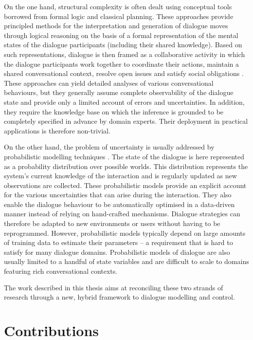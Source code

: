 On the one hand, structural complexity is often dealt using conceptual tools borrowed from formal logic and classical planning.  These approaches provide principled methods for the interpretation and generation of dialogue moves through logical reasoning on the basis of a formal representation of the mental states of the dialogue participants (including their shared knowledge). Based on such representations, dialogue is then framed as a collaborative activity in which the dialogue participants work together to coordinate their actions, maintain a shared conversational context, resolve open issues and satisfy social obligations \citep{larsson2002,Jokinen:2009,Ginzburg2012}. These approaches can yield detailed analyses of various conversational behaviours, but they generally assume complete observability of the dialogue state and provide only a limited account of errors and uncertainties. In addition, they require the knowledge base on which the inference is grounded to be completely specified in advance by domain experts.  Their deployment in practical applications is therefore non-trivial. 

On the other hand, the problem of uncertainty is usually addressed by probabilistic modelling techniques \citep{Roy:2000,FramptonL09,Young:2010}.  The state of the dialogue is here represented as a probability distribution over possible worlds.  This distribution represents the system's current knowledge of the interaction and is regularly updated as new observations are collected. These probabilistic models provide an explicit account for the various uncertainties that can arise during the interaction. They also enable the dialogue behaviour to be automatically optimised in a data-driven manner instead of relying on hand-crafted mechanisms.  Dialogue strategies can therefore be adapted to new environments or users without having to be reprogrammed. However, probabilistic models typically depend on large amounts of training data to estimate their parameters -- a requirement that is hard to satisfy for many dialogue domains.  Probabilistic models of dialogue are also usually limited to a handful of state variables and are difficult to scale to domains featuring rich conversational contexts. 

The work described in this thesis aims at reconciling these two strands of research through a new, hybrid framework to dialogue modelling and control. 

\section{Contributions}

